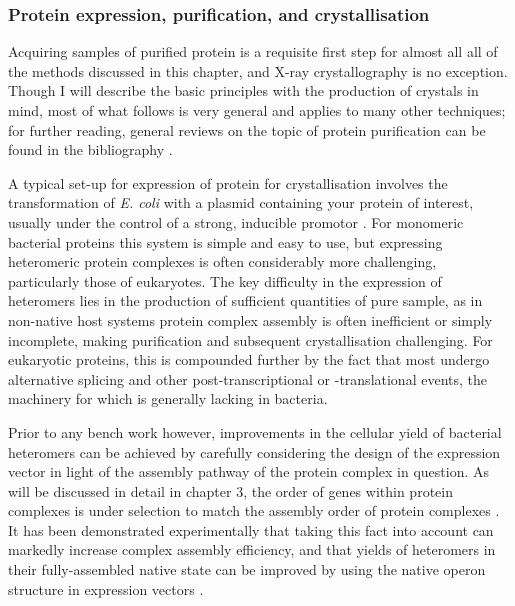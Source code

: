 \documentclass[a4paper,11pt,twoside,openright]{scrbook}
\begin{document}
\subsubsection{Protein expression, purification, and crystallisation}
Acquiring samples of purified protein is a requisite first step for almost all all of the methods discussed in this chapter, and X-ray crystallography is no exception. Though I will describe the basic principles with the production of crystals in mind, most of what follows is very general and applies to many other techniques; for further reading, general reviews on the topic of protein purification can be found in the bibliography \cite{Link2005,Graslund2008,LaCava2016}.

A typical set-up for expression of protein for crystallisation involves the transformation of \textit{E. coli} with a plasmid containing your protein of interest, usually under the control of a strong, inducible promotor \cite{Rosano2014}. For monomeric bacterial proteins this system is simple and easy to use, but expressing heteromeric protein complexes is often considerably more challenging, particularly those of eukaryotes. The key difficulty in the expression of heteromers lies in the production of sufficient quantities of pure sample, as in non-native host systems protein complex assembly is often inefficient or simply incomplete, making purification and subsequent crystallisation challenging. For eukaryotic proteins, this is compounded further by the fact that most undergo alternative splicing and other post-transcriptional or -translational events, the machinery for which is generally lacking in bacteria.

Prior to any bench work however, improvements in the cellular yield of bacterial heteromers can be achieved by carefully considering the design of the expression vector in light of the assembly pathway of the protein complex in question. As will be discussed in detail in chapter 3, the order of genes within protein complexes is under selection to match the assembly order of protein complexes \cite{Wells2016}. It has been demonstrated experimentally that taking this fact into account can markedly increase complex assembly efficiency, and that yields of heteromers in their fully-assembled native state can be improved by using the native operon structure in expression vectors \cite{Shieh2015a, Poulsen2010}.
\end{document}
